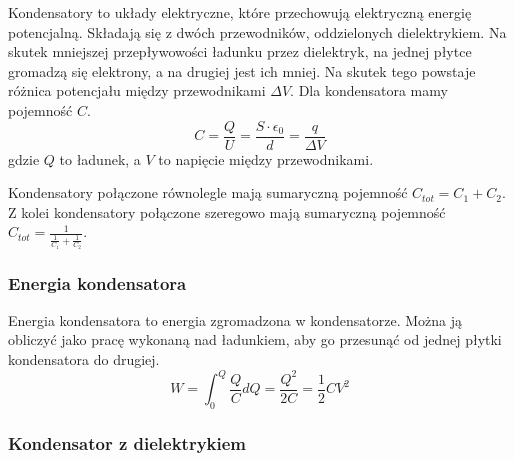 \documentclass{../notatki}
\begin{document}
Kondensatory to układy elektryczne, które przechowują elektryczną energię
potencjalną. Składają się z dwóch przewodników, oddzielonych dielektrykiem.
Na skutek mniejszej przepływowości ładunku przez dielektryk, na jednej płytce
gromadzą się elektrony, a na drugiej jest ich mniej. Na skutek tego powstaje
różnica potencjału między przewodnikami $\Delta V$.
Dla kondensatora mamy pojemność $C$.
$$
C = \frac{Q}{U} = \frac{S \cdot \epsilon_0}{d} = \frac{q}{\Delta V}
$$
gdzie $Q$ to ładunek, a $V$ to napięcie między przewodnikami.
\begin{figure*}[h]
  \centering
\end{figure*}
Kondensatory połączone równolegle mają sumaryczną pojemność $C_{tot}
= C_1 + C_2$. Z kolei kondensatory połączone szeregowo mają sumaryczną pojemność
$C_{tot} = \frac{1}{\frac{1}{C_1} + \frac{1}{C_2}}$.

\subsubsection{Energia kondensatora}

Energia kondensatora to energia zgromadzona w kondensatorze. Można ją
obliczyć jako pracę wykonaną nad ładunkiem, aby go przesunąć od jednej płytki
kondensatora do drugiej.
$$
W = \int_{0}^{Q} \frac{Q}{C} dQ = \frac{Q^2}{2C} = \frac{1}{2} C V^2
$$

\subsubsection{Kondensator z dielektrykiem}
\end{document}
